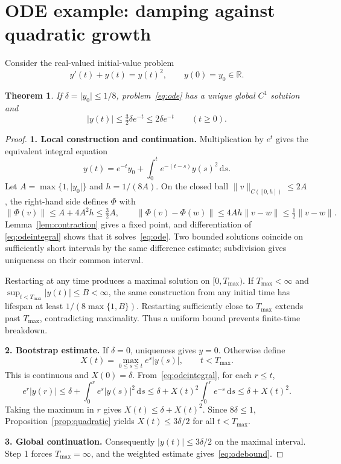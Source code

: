 \documentclass[a4paper,10pt]{article}
\numberwithin{equation}{section}
\newtheorem{theorem}{Theorem}[section]
\theoremstyle{definition}
\theoremstyle{remark}
\newcommand{\R}{\mathbb R}
\newcommand{\norm}[1]{\lVert#1\rVert}
\newcommand{\abs}[1]{\lvert#1\rvert}
\newcommand{\dd}{\,\mathrm d}
\newcommand{\Tmax}{T_{\max}}
\newcommand{\pageheading}[1]{\section{#1}}
\begin{document}
\newpage
\pageheading{ODE example: damping against quadratic growth}
Consider the real-valued initial-value problem
\begin{equation}\label{eq:ode}
y'(t)+y(t)=y(t)^2,\qquad y(0)=y_0\in\R.
\end{equation}
\begin{theorem}\label{thm:ode}
If $\delta=\abs{y_0}\leq1/8$, problem~\eqref{eq:ode} has a unique global
$C^1$ solution and
\begin{equation}\label{eq:odebound}
\abs{y(t)}\leq \tfrac32\delta e^{-t}\leq2\delta e^{-t}
\qquad(t\geq0).
\end{equation}
\end{theorem}
\begin{proof}
\textbf{1. Local construction and continuation.}
Multiplication by $e^t$ gives the equivalent integral equation
\begin{equation}\label{eq:odeintegral}
y(t)=e^{-t}y_0+\int_0^t e^{-(t-s)}y(s)^2\dd s.
\end{equation}
Let $A=\max\{1,\abs{y_0}\}$ and $h=1/(8A)$. On the closed ball
$\norm{v}_{C([0,h])}\leq2A$, the right-hand side defines $\Phi$ with
\[
\norm{\Phi(v)}\leq A+4A^2h\leq\tfrac32A,\qquad
\norm{\Phi(v)-\Phi(w)}\leq4Ah\norm{v-w}\leq\tfrac12\norm{v-w}.
\]
Lemma~\ref{lem:contraction} gives a fixed point, and differentiation of
\eqref{eq:odeintegral} shows that it solves~\eqref{eq:ode}. Two bounded
solutions coincide on sufficiently short intervals by the same difference
estimate; subdivision gives uniqueness on their common interval.

Restarting at any time produces a maximal solution on $[0,\Tmax)$.
If $\Tmax<\infty$ and $\sup_{t<\Tmax}\abs{y(t)}\leq B<\infty$, the same
construction from any initial time has lifespan at least
$1/(8\max\{1,B\})$. Restarting sufficiently close to $\Tmax$ extends past
$\Tmax$, contradicting maximality. Thus a uniform bound prevents finite-time
breakdown.

\textbf{2. Bootstrap estimate.}
If $\delta=0$, uniqueness gives $y=0$. Otherwise define
\[
X(t)=\max_{0\leq s\leq t} e^s\abs{y(s)},\qquad t<\Tmax.
\]
This is continuous and $X(0)=\delta$. From~\eqref{eq:odeintegral}, for
each $r\leq t$,
\[
e^r\abs{y(r)}
\leq\delta+\int_0^r e^s\abs{y(s)}^2\dd s
\leq\delta+X(t)^2\int_0^r e^{-s}\dd s
\leq\delta+X(t)^2.
\]
Taking the maximum in $r$ gives $X(t)\leq\delta+X(t)^2$.
Since $8\delta\leq1$, Proposition~\ref{prop:quadratic} yields
$X(t)\leq3\delta/2$ for all $t<\Tmax$.

\textbf{3. Global continuation.}
Consequently $\abs{y(t)}\leq3\delta/2$ on the maximal interval. Step 1
forces $\Tmax=\infty$, and the weighted estimate gives~\eqref{eq:odebound}.
\end{proof}
\end{document}
